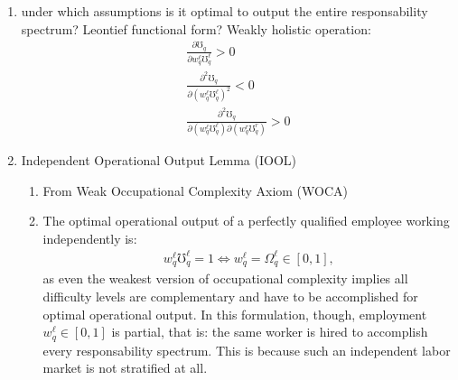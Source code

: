 \documentclass[hidelinks, nonatbib]{elsarticle}
\begin{document}
\begin{enumerate}
    \item under which assumptions is it optimal to output the entire responsability spectrum? Leontief functional form? Weakly holistic operation:
    \begin{gather}
        \frac{
            \partial
            \mho_q
        }{
            \partial
            w_{q}^{\ell}
            \mho_{q}^{\ell}
        }
        > 0
        \\
        \frac{
            \partial ^ 2
            \mho_q
        }{
            \partial
            \left(
                w_{q}^{\ell}
                \mho_{q}^{\ell}
            \right) ^ 2
        }
        < 0
        \\
        \frac{
            \partial ^ 2
            \mho_q
        }{
            \partial
            \left(
                w_{q}^{\ell}
                \mho_{q}^{\ell}
            \right)
            \partial
            \left(
                w_{q}^{r}
                \mho_{q}^{r}
            \right)
        }
        > 0
    \end{gather}
    \item Independent Operational Output Lemma (IOOL)
    \begin{enumerate}
        \item From Weak Occupational Complexity Axiom (WOCA)
        \item The optimal operational output of a perfectly qualified employee working independently is:
        \begin{gather}
            w_{q}^{\ell}
            \mho_{q}^{\ell}
            =
            1
            \iff
            w_{q}^{\ell}
            =
            \Omega_{q}^{\ell}
            \in [0,1]
            ,
        \end{gather}
        as even the weakest version of occupational complexity implies all difficulty levels are complementary and have to be accomplished for optimal operational output.
        In this formulation, though, employment $w_{q}^{\ell} \in [0,1]$ is partial, that is: the same worker is hired to accomplish every responsability spectrum. This is because such an independent labor market is not stratified at all.


\end{enumerate}
\end{enumerate}
\end{document}
